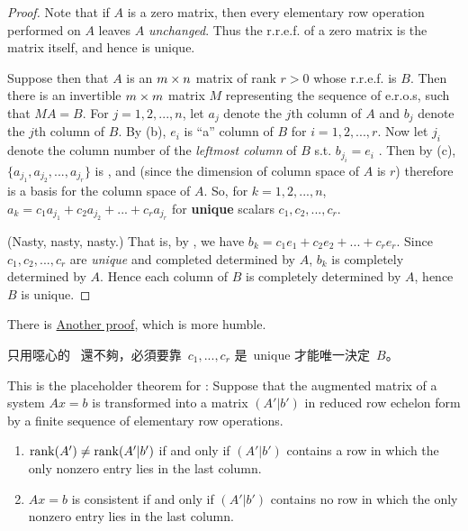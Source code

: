 \begin{proof}
Note that if \(A\) is a zero matrix, then every elementary row operation performed on \(A\) leaves \(A\) \emph{unchanged}.
Thus the r.r.e.f. of a zero matrix is the matrix itself, and hence is unique.

Suppose then that \(A\) is an \(m \times n\) matrix of rank \(r > 0\) whose r.r.e.f. is \(B\).
Then there is an invertible \(m \times m\) matrix \(M\) representing the sequence of e.r.o.s, such that \(MA = B\).
For \(j = 1, 2, ..., n\), let \(a_j\) denote the \(j\)th column of \(A\) and \(b_j\) denote the \(j\)th column of \(B\).
By (b), \(e_i\) is ``a'' column of \(B\) for \(i = 1, 2, ..., r\).
Now let \(j_i\) denote the column number of the \emph{leftmost column} of \(B\) s.t. \(b_{j_i} = e_i\) .
Then by (c), \(\{ a_{j_1}, a_{j_2}, ..., a_{j_r} \}\) is \LID{}, and (since the dimension of column space of \(A\) is \(r\)) therefore is a basis for the column space of \(A\).
So, for \(k = 1, 2, ..., n\), \(a_k = c_1 a_{j_1} + c_2 a_{j_2} + ... + c_r a_{j_r}\) for \textbf{unique} scalars \(c_1, c_2, ..., c_r\).

(Nasty, nasty, nasty.)
That is, by , we have \(b_k = c_1 e_1 + c_2 e_2 + ... + c_r e_r\).
Since \(c_1, c_2, ..., c_r\) are \emph{unique} and completed determined by \(A\), \(b_k\) is completely determined by \(A\).
Hence each column of \(B\) is completely determined by \(A\), hence \(B\) is unique.
\end{proof}

\begin{note}
There is \href{https://www.youtube.com/watch?v=EcgaeUUYV1U&ab_channel=DrPeyam}{Another proof}, which is more humble.
\end{note}

\begin{note}
只用噁心的\  還不夠，必須要靠\ \(c_1, ..., c_r\) 是\ unique 才能唯一決定\ \(B\)。
\end{note}

\begin{additional theorem} \label{athm 3.15}
This is the placeholder theorem for :
Suppose that the augmented matrix of a system \(Ax = b\) is transformed into a matrix \((A'|b')\) in reduced row echelon form by a finite sequence of elementary row operations.
\begin{enumerate}
\item \(\mathrm{rank}(A') \ne \mathrm{rank}(A'|b')\) if and only if \((A'|b')\) contains a row in which the only nonzero entry lies in the last column.
\item \(Ax = b\) is consistent if and only if \((A'|b')\) contains no row in which the only nonzero entry lies in the last column.
\end{enumerate}
\end{additional theorem}

